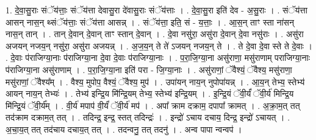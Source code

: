 \documentclass[17pt]{extarticle}
\begin{document}
1. दे॒वा॒सु॒राः संॅय॑त्ताः॒ संॅय॑त्ता देवासु॒रा दे॑वासु॒राः संॅय॑त्ताः । . दे॒वा॒सु॒रा इति॑ देव - अ॒सु॒राः । . संॅय॑त्ता आसन् नास॒न् थ्संॅय॑त्ताः॒ संॅय॑त्ता आसन्न् । . संॅय॑त्ता॒ इति॒ सं - य॒त्ताः॒ । . आ॒स॒न् ताꣳ स्ता ना॑सन् नास॒न् तान् । . तान् दे॒वान् दे॒वान् ताꣳ स्तान् दे॒वान् । . दे॒वा नसु॑रा॒ असु॑रा दे॒वान् दे॒वा नसु॑राः । . असु॑रा अजयन् नजय॒न् नसु॑रा॒ असु॑रा अजयन्न् । . अ॒ज॒य॒न् ते ते॑ ऽजयन् नजय॒न् ते । . ते दे॒वा दे॒वा स्ते ते दे॒वाः । . दे॒वाः प॑राजिग्या॒नाः प॑राजिग्या॒ना दे॒वा दे॒वाः प॑राजिग्या॒नाः । . प॒रा॒जि॒ग्या॒ना असु॑राणा॒ मसु॑राणाम् पराजिग्या॒नाः प॑राजिग्या॒ना असु॑राणाम् । . प॒रा॒जि॒ग्या॒ना इति॑ परा - जि॒ग्या॒नाः । . असु॑राणां॒ ॅवैश्यं॒ ॅवैश्य॒ मसु॑राणा॒ मसु॑राणां॒ ॅवैश्य᳚म् । . वैश्य॒ मुपोप॒ वैश्यं॒ ॅवैश्य॒ मुप॑ । . उपा॑यन् नाय॒न् नुपोपा॑यन्न् । . आ॒य॒न् तेभ्य॒ स्तेभ्य॑ आयन् नाय॒न् तेभ्यः॑ । . तेभ्य॑ इन्द्रि॒य मि॑न्द्रि॒यम् तेभ्य॒ स्तेभ्य॑ इन्द्रि॒यम् । . इ॒न्द्रि॒यं ॅवी॒र्यं॑ ॅवी॒र्य॑ मिन्द्रि॒य मि॑न्द्रि॒यं ॅवी॒र्य᳚म् । . वी॒र्य॑ मपाप॑ वी॒र्यं॑ ॅवी॒र्य॑ मप॑ । . अपा᳚ क्राम दक्राम॒ दपापा᳚ क्रामत् । . अ॒क्रा॒म॒त् तत् तद॑क्राम दक्राम॒त् तत् । . तदिन्द्र॒ इन्द्र॒ स्तत् तदिन्द्रः॑ । . इन्द्रो॑ ऽचाय दचाय॒ दिन्द्र॒ इन्द्रो॑ ऽचायत् । . अ॒चा॒य॒त् तत् तद॑चाय दचाय॒त् तत् । . तदन्वनु॒ तत् तदनु॑ । . अन्व पापा न्वन्वप॑ । \newline
\end{document}
